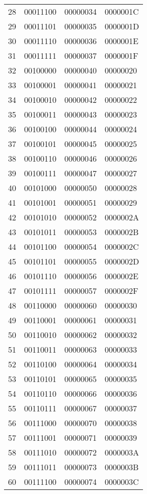 \documentclass{article}
\begin{document}
\begin{longtable}{|r|l|l|l|}
28 & 00011100 & 00000034 & 0000001C \\
29 & 00011101 & 00000035 & 0000001D \\
30 & 00011110 & 00000036 & 0000001E \\
31 & 00011111 & 00000037 & 0000001F \\
32 & 00100000 & 00000040 & 00000020 \\
33 & 00100001 & 00000041 & 00000021 \\
34 & 00100010 & 00000042 & 00000022 \\
35 & 00100011 & 00000043 & 00000023 \\
36 & 00100100 & 00000044 & 00000024 \\
37 & 00100101 & 00000045 & 00000025 \\
38 & 00100110 & 00000046 & 00000026 \\
39 & 00100111 & 00000047 & 00000027 \\
40 & 00101000 & 00000050 & 00000028 \\
41 & 00101001 & 00000051 & 00000029 \\
42 & 00101010 & 00000052 & 0000002A \\
43 & 00101011 & 00000053 & 0000002B \\
44 & 00101100 & 00000054 & 0000002C \\
45 & 00101101 & 00000055 & 0000002D \\
46 & 00101110 & 00000056 & 0000002E \\
47 & 00101111 & 00000057 & 0000002F \\
48 & 00110000 & 00000060 & 00000030 \\
49 & 00110001 & 00000061 & 00000031 \\
50 & 00110010 & 00000062 & 00000032 \\
51 & 00110011 & 00000063 & 00000033 \\
52 & 00110100 & 00000064 & 00000034 \\
53 & 00110101 & 00000065 & 00000035 \\
54 & 00110110 & 00000066 & 00000036 \\
55 & 00110111 & 00000067 & 00000037 \\
56 & 00111000 & 00000070 & 00000038 \\
57 & 00111001 & 00000071 & 00000039 \\
58 & 00111010 & 00000072 & 0000003A \\
59 & 00111011 & 00000073 & 0000003B \\
60 & 00111100 & 00000074 & 0000003C \\

\end{longtable}
\end{document}
